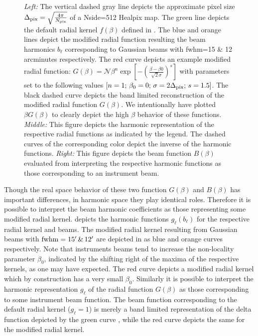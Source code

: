 \begin{figure}[!t] 
\centering
{}
\caption{\textit{Left:} The vertical dashed gray line depicts the approximate pixel size $\Delta_{\rm pix} = \sqrt{\frac{4 \pi}{N_{\rm pix}}}$ of a Nside=512 Healpix map. The green line depicts the default radial kernel $f(\beta)$ defined in . The blue and orange lines depict the modified radial function resulting the beam harmonics $b_{\ell}$ corresponding to Gaussian beams with fwhm=15 \& 12 arcminutes respectively. The red curve depicts an example modified radial function: $G(\beta)=\mathcal{N} \beta^n \exp{\left[ -\left( \frac{\beta-\beta0}{\sqrt{2} \sigma} \right)^s \right]}$ with parameters set to the following values $[n=1;\, \beta_0=0 ;\, \sigma = 2\Delta_{\rm pix} ;\, s=1.5]$. The black dashed curve depicts the band limited reconstruction of the modified radial function $G(\beta)$. We intentionally have plotted $\beta G(\beta)$ to clearly depict the high $\beta$ behavior of these functions. \textit{Middle: } This figure depicts the harmonic representation of the respective radial functions as indicated by the legend. The dashed curves of the corresponding color depict the inverse of the harmonic functions. \textit{Right:} This figure depicts the beam function $B(\beta)$ evaluated from interpreting the respective harmonic functions as those corresponding to an instrument beam.}
\label{fig:example_gbeta}
\end{figure}
%

Though the real space behavior of these two function $G(\beta)$ and $B(\beta)$ has important differences, in harmonic space they play identical roles. Therefore it is possible to interpret the beam harmonic coefficients as those representing some modified radial kernel.  depicts the harmonic functions $g_{\ell} (b_{\ell})$ for the respective radial kernel and beams.  The modified radial kernel resulting from Gaussian beams with ${\rm fwhm} =15' \,\&\, 12'$ are depicted in  as blue and orange curves respectively. Note that instruments  beams tend to increase the non-locality parameter $\beta_0$, indicated by the shifting right of the maxima of the respective kernels, as one may have expected. The red curve depicts a modified radial kernel which by construction has a very small $\beta_0$.  Similarly it is possible to interpret the harmonic representation $g_{\ell}$ of the radial function $G(\beta)$ as those corresponding to some instrument beam function. The beam function corresponding to the default radial kernel ($g_{\ell}=1$) is merely a band limited representation of the delta function depicted by the green curve , while the red curve depicts the same for the modified radial kernel.

